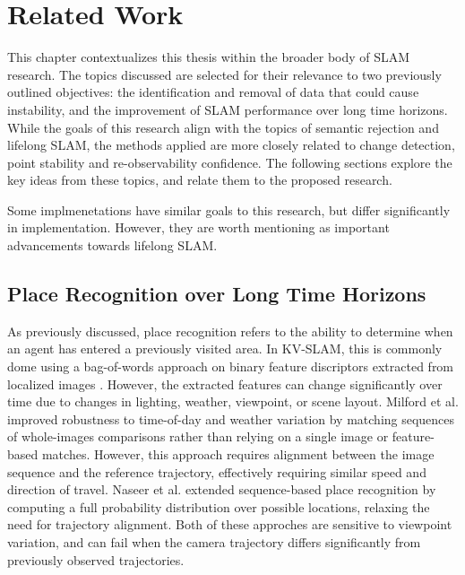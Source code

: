 \section{Related Work}
\label{sec:related_work}

This chapter contextualizes this thesis within the broader body of SLAM research. The topics discussed are selected for their relevance to two previously outlined objectives: the identification and removal of data that could cause instability, and the improvement of SLAM performance over long time horizons. While the goals of this research align with the topics of semantic rejection and lifelong SLAM, the methods applied are more closely related to change detection, point stability and re-observability confidence. The following sections explore the key ideas from these topics, and relate them to the proposed research.

Some implmenetations have similar goals to this research, but differ significantly in implementation. However, they are worth mentioning as important advancements towards lifelong SLAM.

\subsection{Place Recognition over Long Time Horizons}

As previously discussed, place recognition refers to the ability to determine when an agent has entered a previously visited area. In KV-SLAM, this is commonly dome using a bag-of-words approach on binary feature discriptors extracted from localized images \cite{camposORBSLAM3AccurateOpenSource2021}. However, the extracted features can change significantly over time due to changes in lighting, weather, viewpoint, or scene layout. Milford et al. improved robustness to time-of-day and weather variation by matching sequences of whole-images comparisons rather than relying on a single image or feature-based matches. However, this approach requires alignment between the image sequence and the reference trajectory, effectively requiring similar speed and direction of travel. Naseer et al. \cite{naseerVisionbasedMarkovLocalization2015} extended sequence-based place recognition by computing a full probability distribution over possible locations, relaxing the need for trajectory alignment. Both of these approches are sensitive to viewpoint variation, and can fail when the camera trajectory differs significantly from previously observed trajectories.

